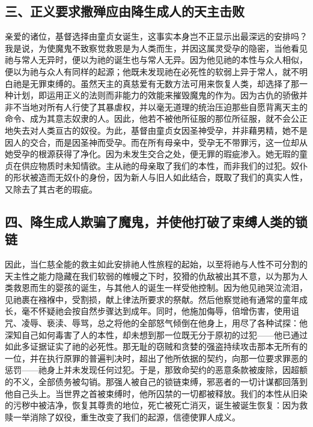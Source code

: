 
\subsection{三、正义要求撒殚应由降生成人的天主击败}

亲爱的诸位，基督选择由童贞女诞生，这事实本身岂不正显示出最深远的安排吗？我是说，为使魔鬼不致察觉救恩是为人类而生，并因这属灵受孕的隐密，当他看见祂与常人无异时，便以为祂的诞生也与常人无异。因为他见祂的本性与众人相似，便以为祂与众人有同样的起源；他既未发现祂在必死性的软弱上异于常人，就不明白祂是无罪束缚的。虽然天主的真慈爱有无数方法可用来恢复人类，却选择了那一种计划，即运用正义的法则而非能力的效能来摧毁魔鬼的作为。因为古仇的骄傲并非不当地对所有人行使了其暴虐权，并以毫无道理的统治压迫那些自愿背离天主的命令、成为其意志奴隶的人。因此，他若不被他所征服的那位所征服，就不会公正地失去对人类亘古的奴役。为此，基督由童贞女因圣神受孕，并非藉男精，她不是因人的交合，而是因圣神而受孕。而在所有母亲中，受孕无不带罪污，这一位却从她受孕的根源获得了净化。因为未发生交合之处，便无罪的瑕疵渗入。她无瑕的童贞在供应物质时未知情欲。主从祂的母亲取了我们的本性，而非我们的过犯。奴仆的形状被造而无奴仆的身份，因为新人与旧人如此结合，既取了我们的真实人性，又除去了其古老的瑕疵。\par


\subsection{四、降生成人欺骗了魔鬼，并使他打破了束缚人类的锁链}

因此，当仁慈全能的救主如此安排祂人性旅程的起始，以至将祂与人性不可分割的天主性之能力隐藏在我们软弱的帷幔之下时，狡猾的仇敌被出其不意，以为那为人类救恩而生的婴孩的诞生，与其他人的诞生一样受他控制。因为他见祂哭泣流泪，见祂裹在襁褓中，受割损，献上律法所要求的祭献。然后他察觉祂有通常的童年成长，毫不怀疑祂会按自然步骤达到成年。同时，他施加侮辱，倍增伤害，使用诅咒、凌辱、亵渎、辱骂，总之将他的全部怒气倾倒在他身上，用尽了各种试探：他深知自己如何毒害了人的本性，却未想到那一位既无分于原初的过犯——他已通过如此多证据证实了祂的必死性。那无耻的窃贼和贪婪的强盗持续攻击那本无所有的一位，并在执行原罪的普遍判决时，超出了他所依据的契约，向那一位要求罪恶的惩罚——祂身上并未发现任何过犯。于是，那致命契约的恶意条款被废除，因超额的不义，全部债务被勾销。那强人被自己的锁链束缚，邪恶者的一切计谋都回落到他自己头上。当世界之首被束缚时，他所囚禁的一切都被释放。我们的本性从旧染的污秽中被洁净，恢复其尊贵的地位，死亡被死亡消灭，诞生被诞生恢复：因为救赎一举消除了奴役，重生改变了我们的起源，信德使罪人成义。\par

